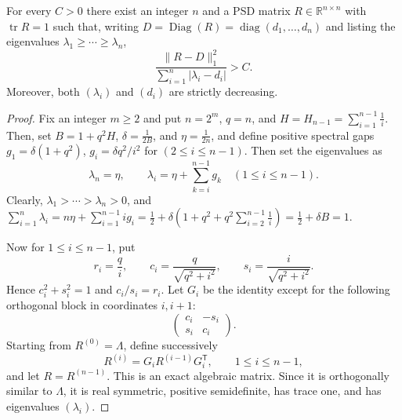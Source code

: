 \begin{cxrefutation}

\begin{theorem}\label{thm:odonnell-matrix-conjecture}
For every $C>0$ there exist an integer $n$ and a PSD matrix $R\in\mathbb R^{n\times n}$ with $\operatorname{tr}R=1$ such that, writing $D=\operatorname{Diag}(R)=\operatorname{diag}(d_1,\ldots,d_n)$ and listing the eigenvalues $\lambda_1\geq\cdots\geq\lambda_n$, 
\[
  \frac{\lVert R-D\rVert_1^2}
       {\sum_{i=1}^n |\lambda_i-d_i|}>C.
\]
Moreover, both $(\lambda_i)$ and $(d_i)$ are strictly decreasing.
\end{theorem}

\begin{proof}
Fix an integer $m\geq2$ and put $n=2^m$, $q=n$, and $H=H_{n-1}=\sum_{i=1}^{n-1}\frac1i$.  Then, set
$B=1+q^2H$, $\delta=\frac1{2B}$, and $\eta=\frac1{2n}$, and define positive spectral gaps 
$g_1=\delta(1+q^2)$, $g_i=\delta q^2/i^2$ for $(2\leq i\leq n-1)$. Then set the eigenvalues as
\[
  \lambda_n=\eta,
  \qquad
  \lambda_i=\eta+\sum_{k=i}^{n-1}g_k
  \quad (1\leq i\leq n-1).
\]
Clearly, $\lambda_1>\cdots>\lambda_n>0$, and $\sum_{i=1}^n\lambda_i =n\eta+\sum_{i=1}^{n-1}i g_i =\frac12+\delta\left(1+q^2+q^2\sum_{i=2}^{n-1}\frac1i\right) =\frac12+\delta B=1$.

Now for $1\leq i\leq n-1$, put
\[
  r_i=\frac qi,
  \qquad
  c_i=\frac{q}{\sqrt{q^2+i^2}},
  \qquad
  s_i=\frac{i}{\sqrt{q^2+i^2}}.
\]
Hence $c_i^2+s_i^2=1$ and $c_i/s_i=r_i$.  Let $G_i$ be the identity except
for the following orthogonal block in coordinates $i,i+1$:
\[
  \begin{pmatrix}
    c_i&-s_i\\
    s_i& c_i
  \end{pmatrix}.
\]
Starting from $R^{(0)}=\Lambda$, define successively
\[
  R^{(i)}=G_iR^{(i-1)}G_i^{\mathsf T},
  \qquad 1\leq i\leq n-1,
\]
and let $R=R^{(n-1)}$.  This is an exact algebraic matrix.  Since it is
orthogonally similar to $\Lambda$, it is real symmetric, positive semidefinite,
has trace one, and has eigenvalues $(\lambda_i)$.


\end{proof}
\end{cxrefutation}
